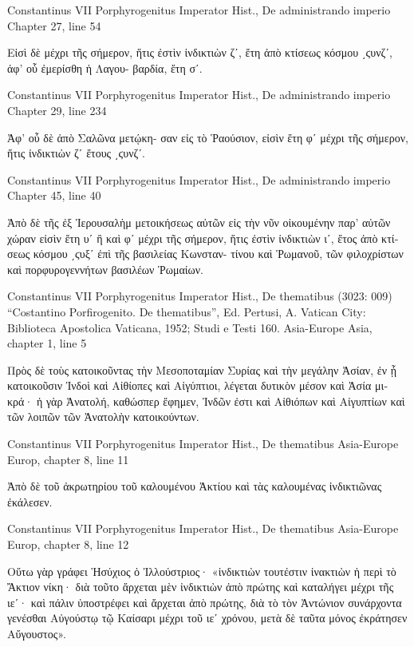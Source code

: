 \documentclass[12pt,letterpaper,twoside,final]{memoir}
\begin{document}
\begin{greek}
Constantinus VII Porphyrogenitus Imperator Hist., De administrando imperio 
Chapter 27, line 54

                                   Εἰσὶ δὲ μέχρι τῆς σήμερον, ἥτις ἐστὶν 
ἰνδικτιὼν ζʹ, ἔτη ἀπὸ κτίσεως κόσμου ͵ϛυνζʹ, ἀφ' οὗ ἐμερίσθη ἡ Λαγου-
βαρδία, ἔτη σʹ. 



Constantinus VII Porphyrogenitus Imperator Hist., De administrando imperio 
Chapter 29, line 234

                                        Ἀφ' οὗ δὲ ἀπὸ Σαλῶνα μετῴκη-
σαν εἰς τὸ Ῥαούσιον, εἰσὶν ἔτη φʹ μέχρι τῆς σήμερον, ἥτις ἰνδικτιὼν ζʹ 
ἔτους ͵ϛυνζʹ. 



Constantinus VII Porphyrogenitus Imperator Hist., De administrando imperio 
Chapter 45, line 40

Ἀπὸ δὲ τῆς ἐξ Ἱερουσαλὴμ μετοικήσεως αὐτῶν εἰς τὴν νῦν οἰκουμένην 
παρ' αὐτῶν χώραν εἰσὶν ἔτη υʹ ἢ καὶ φʹ μέχρι τῆς σήμερον, ἥτις ἐστὶν 
ἰνδικτιὼν ιʹ, ἔτος ἀπὸ κτίσεως κόσμου ͵ϛυξʹ ἐπὶ τῆς βασιλείας Κωνσταν-
τίνου καὶ Ῥωμανοῦ, τῶν φιλοχρίστων καὶ πορφυρογεννήτων βασιλέων 
Ῥωμαίων. 



Constantinus VII Porphyrogenitus Imperator Hist., De thematibus (3023: 009)
“Costantino Porfirogenito. De thematibus”, Ed. Pertusi, A.
Vatican City: Biblioteca Apostolica Vaticana, 1952; Studi e Testi 160.
Asia-Europe Asia, chapter 1, line 5

                                                                          Πρὸς δὲ 
τοὺς κατοικοῦντας τὴν Μεσοποταμίαν Συρίας καὶ τὴν μεγάλην Ἀσίαν, ἐν 
ᾗ κατοικοῦσιν Ἰνδοὶ καὶ Αἰθίοπες καὶ Αἰγύπτιοι, λέγεται δυτικὸν μέσον 
καὶ Ἀσία μικρά· ἡ γὰρ Ἀνατολή, καθώσπερ ἔφημεν, Ἰνδῶν ἐστι καὶ 
Αἰθιόπων καὶ Αἰγυπτίων καὶ τῶν λοιπῶν τῶν Ἀνατολὴν κατοικούντων. 



Constantinus VII Porphyrogenitus Imperator Hist., De thematibus 
Asia-Europe Europ, chapter 8, line 11

                                                                              Ἀπὸ 
δὲ τοῦ ἀκρωτηρίου τοῦ καλουμένου Ἀκτίου καὶ τὰς καλουμένας ἰνδικτιῶνας 
ἐκάλεσεν. 



Constantinus VII Porphyrogenitus Imperator Hist., De thematibus 
Asia-Europe Europ, chapter 8, line 12

            Οὕτω γὰρ γράφει Ἡσύχιος ὁ Ἰλλούστριος· «ἰνδικτιὼν τουτέστιν 
ἰνακτιὼν ἡ περὶ τὸ Ἄκτιον νίκη· διὰ τοῦτο ἄρχεται μὲν ἰνδικτιὼν ἀπὸ 
πρώτης καὶ καταλήγει μέχρι τῆς ιεʹ· καὶ πάλιν ὑποστρέφει καὶ ἄρχεται 
ἀπὸ πρώτης, διὰ τὸ τὸν Ἀντώνιον συνάρχοντα γενέσθαι Αὐγούστῳ τῷ 
Καίσαρι μέχρι τοῦ ιεʹ χρόνου, μετὰ δὲ ταῦτα μόνος ἐκράτησεν Αὔγουστος». 




\end{greek}
\end{document}
